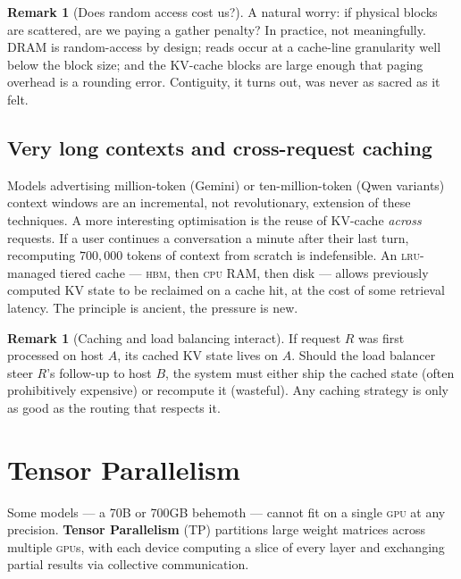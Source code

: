 \documentclass[11pt,a4paper]{article}
\theoremstyle{definition}
\newtheorem{remark}[definition]{Remark}
\theoremstyle{plain}
\newcommand{\HBM}{\textsc{hbm}}
\newcommand{\GPU}{\textsc{gpu}}
\begin{document}
\begin{remark}[Does random access cost us?]
A natural worry: if physical blocks are scattered, are we paying a gather penalty? In practice, not meaningfully. DRAM is random-access by design; reads occur at a cache-line granularity well below the block size; and the KV-cache blocks are large enough that paging overhead is a rounding error. Contiguity, it turns out, was never as sacred as it felt.
\end{remark}

\subsection{Very long contexts and cross-request caching}

Models advertising million-token (Gemini) or ten-million-token (Qwen variants) context windows are an incremental, not revolutionary, extension of these techniques. A more interesting optimisation is the reuse of KV-cache \emph{across} requests. If a user continues a conversation a minute after their last turn, recomputing $700{,}000$ tokens of context from scratch is indefensible. An \textsc{lru}-managed tiered cache --- \HBM{}, then \textsc{cpu} RAM, then disk --- allows previously computed KV state to be reclaimed on a cache hit, at the cost of some retrieval latency. The principle is ancient, the pressure is new.

\begin{remark}[Caching and load balancing interact]
If request $R$ was first processed on host $A$, its cached KV state lives on $A$. Should the load balancer steer $R$'s follow-up to host $B$, the system must either ship the cached state (often prohibitively expensive) or recompute it (wasteful). Any caching strategy is only as good as the routing that respects it.
\end{remark}

\section{Tensor Parallelism}


Some models --- a 70B or 700GB behemoth --- cannot fit on a single \GPU{} at any precision. \textbf{Tensor Parallelism} (TP) partitions large weight matrices across multiple \GPU{}s, with each device computing a slice of every layer and exchanging partial results via collective communication.
\end{document}
